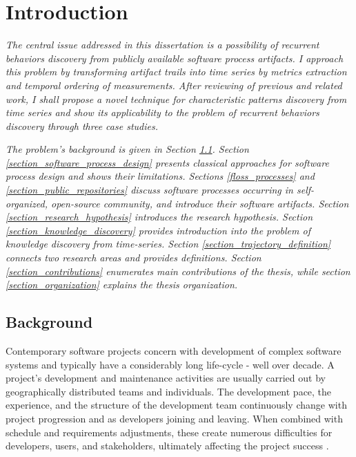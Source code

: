 \chapter{Introduction}\label{chapter_introduction}
\textit{The central issue addressed in this dissertation is a possibility of recurrent behaviors discovery from 
publicly available software process artifacts. I approach this problem by transforming artifact trails into 
time series by metrics extraction and temporal ordering of measurements. After reviewing of previous and related 
work, I shall propose a novel technique for characteristic patterns discovery from time series and show its 
applicability to the problem of recurrent behaviors discovery through three case studies.}

\textit{The problem's background is given in Section \ref{section_background}. 
Section \ref{section_software_process_design} presents classical approaches for software process design and 
shows their limitations. 
Sections \ref{floss_processes} and \ref{section_public_repositories} discuss software processes occurring in 
self-organized, open-source community, and introduce their software artifacts.
Section \ref{section_research_hypothesis} introduces the research hypothesis.
Section \ref{section_knowledge_discovery} provides introduction into the problem of knowledge discovery from time-series.
Section \ref{section_trajectory_definition} connects two research areas and provides definitions.
Section \ref{section_contributions} enumerates main contributions of the thesis, 
while section \ref{section_organization} explains the thesis organization.}

%
%
\section{Background}\label{section_background}
Contemporary software projects concern with development of complex software systems and typically have 
a considerably long life-cycle - well over decade.
A project's development and maintenance activities are usually carried out by geographically 
distributed teams and individuals. The development pace, the experience, and the structure of the 
development team continuously change with project progression and as developers joining and leaving. 
When combined with schedule and requirements adjustments, these create numerous difficulties 
for developers, users, and stakeholders, ultimately affecting the project success \cite{citeulike:2207657}. 

